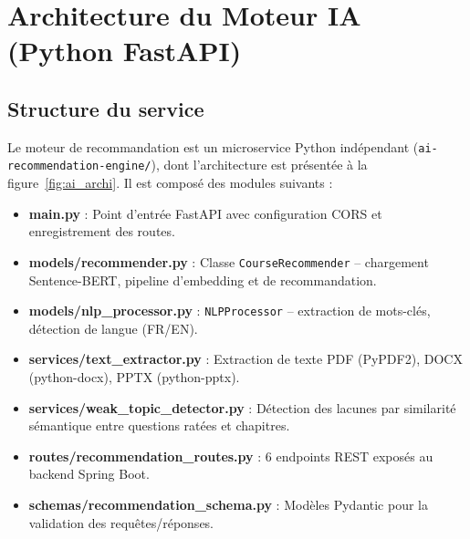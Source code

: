 \documentclass[12pt,a4paper]{report}
\begin{document}
\section{Architecture du Moteur IA (Python FastAPI)}

\subsection{Structure du service}

Le moteur de recommandation est un microservice Python indépendant (\texttt{ai-recommendation-engine/}), dont l'architecture est présentée à la figure~\ref{fig:ai_archi}. Il est composé des modules suivants :

\begin{itemize}
  \item \textbf{main.py} : Point d'entrée FastAPI avec configuration CORS et enregistrement des routes.
  \item \textbf{models/recommender.py} : Classe \texttt{CourseRecommender} -- chargement Sentence-BERT, pipeline d'embedding et de recommandation.
  \item \textbf{models/nlp\_processor.py} : \texttt{NLPProcessor} -- extraction de mots-clés, détection de langue (FR/EN).
  \item \textbf{services/text\_extractor.py} : Extraction de texte PDF (PyPDF2), DOCX (python-docx), PPTX (python-pptx).
  \item \textbf{services/weak\_topic\_detector.py} : Détection des lacunes par similarité sémantique entre questions ratées et chapitres.
  \item \textbf{routes/recommendation\_routes.py} : 6 endpoints REST exposés au backend Spring Boot.
  \item \textbf{schemas/recommendation\_schema.py} : Modèles Pydantic pour la validation des requêtes/réponses.
\end{itemize}
\end{document}

